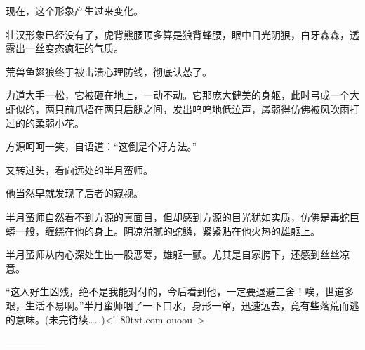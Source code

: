 \begin{this_body}
现在，这个形象产生过来变化。

壮汉形象已经没有了，虎背熊腰顶多算是狼背蜂腰，眼中目光阴狠，白牙森森，透露出一丝变态疯狂的气质。

荒兽鱼翅狼终于被击溃心理防线，彻底认怂了。

力道大手一松，它被砸在地上，一动不动。它那庞大健美的身躯，此时弓成一个大虾似的，两只前爪捂在两只后腿之间，发出呜呜地低泣声，孱弱得仿佛被风吹雨打过的的柔弱小花。

方源呵呵一笑，自语道：“这倒是个好方法。”

又转过头，看向远处的半月蛮师。

他当然早就发现了后者的窥视。

半月蛮师自然看不到方源的真面目，但却感到方源的目光犹如实质，仿佛是毒蛇巨蟒一般，缠绕在他的身上。阴凉滑腻的蛇鳞，紧紧贴在他火热的雄躯上。

半月蛮师从内心深处生出一股恶寒，雄躯一颤。尤其是自家胯下，还感到丝丝凉意。

“这人好生凶残，绝不是我能对付的，今后看到他，一定要退避三舍！唉，世道多艰，生活不易啊。”半月蛮师咽了一下口水，身形一窜，迅速远去，竟有些落荒而逃的意味。(未完待续……)<!--80txt.com-ouoou-->

------------

\end{this_body}

